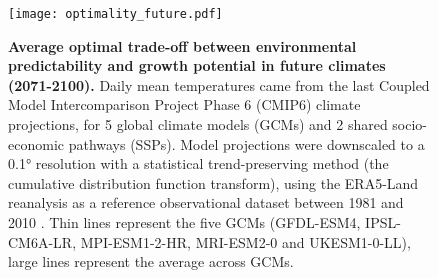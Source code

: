 \documentclass[11pt,letter]{article}
\begin{document}
\begin{figure}[h]
\centering
\texttt{[image: optimality\_future.pdf]}
\vspace*{-0.5cm}
\caption{\textbf{Average optimal trade-off between environmental predictability and growth potential in future climates (2071-2100).} Daily mean temperatures came from the last Coupled Model Intercomparison Project Phase 6 (CMIP6) climate  projections, for 5 global climate models (GCMs) and 2 shared socio-economic pathways (SSPs). Model projections were downscaled to a 0.1° resolution with a statistical trend-preserving method (the cumulative distribution function transform), using the ERA5-Land reanalysis as a reference observational dataset between 1981 and 2010 \citep{Noel2022}. Thin lines represent the five GCMs (GFDL-ESM4, IPSL-CM6A-LR, MPI-ESM1-2-HR, MRI-ESM2-0 and UKESM1-0-LL), large lines represent the average across GCMs.}
\label{fig:future}
\vspace*{-10cm}
\end{figure}


\clearpage
\vspace*{1cm}

\end{document}
